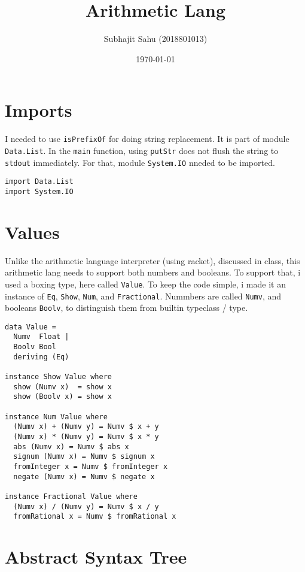 \documentclass[11pt]{article}
\author{Subhajit Sahu (2018801013)}
\date{\today}
\title{Arithmetic Lang}
\begin{document}
\maketitle
\tableofcontents




\section{Imports}
\label{sec:orgdbb9a84}

I needed to use \texttt{isPrefixOf} for doing string replacement. It is part of
module \texttt{Data.List}. In the \texttt{main} function, using \texttt{putStr} does not flush
the string to \texttt{stdout} immediately. For that, module \texttt{System.IO} nneded
to be imported.

\begin{verbatim}
import Data.List
import System.IO
\end{verbatim}



\section{Values}
\label{sec:org0f91885}

Unlike the arithmetic language interpreter (using racket), discussed in
class, this arithmetic lang needs to support both numbers and booleans.
To support that, i used a boxing type, here called \texttt{Value}. To keep the
code simple, i made it an instance of \texttt{Eq}, \texttt{Show}, \texttt{Num}, and \texttt{Fractional}.
Nummbers are called \texttt{Numv}, and booleans \texttt{Boolv}, to distinguish them from
builtin typeclass / type.

\begin{verbatim}
data Value =
  Numv  Float |
  Boolv Bool
  deriving (Eq)

instance Show Value where
  show (Numv x)  = show x
  show (Boolv x) = show x

instance Num Value where
  (Numv x) + (Numv y) = Numv $ x + y
  (Numv x) * (Numv y) = Numv $ x * y
  abs (Numv x) = Numv $ abs x
  signum (Numv x) = Numv $ signum x
  fromInteger x = Numv $ fromInteger x
  negate (Numv x) = Numv $ negate x

instance Fractional Value where
  (Numv x) / (Numv y) = Numv $ x / y
  fromRational x = Numv $ fromRational x
\end{verbatim}



\section{Abstract Syntax Tree}
\label{sec:org187dc02}
\end{document}
